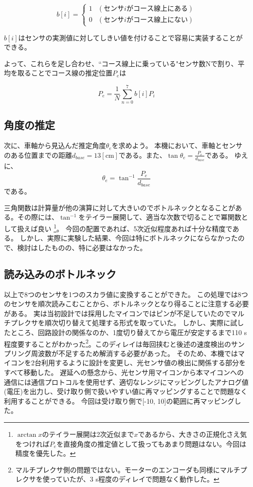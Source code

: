 \documentclass{ltjsreport}
\begin{document}
\begin{equation}
  b[i] = 
  \begin{cases}
   1 & (センサiがコース線上にある) \\
   0 & (センサiがコース線上にない)
   \end{cases}
\end{equation}

$b[i]$はセンサの実測値に対してしきい値を付けることで容易に実装することができる。

よって、これらを足し合わせ、``コース線上に乗っている"センサ数Nで割り、平均を取ることでコース線の推定位置$P_e$は

\[ 
  P_e = \frac{1}{N} \sum_{n=0}^7 b[i] P_i
    \]

\subsection{角度の推定}

次に、車軸から見込んだ推定角度$\theta_e$を求めよう。
本機において、車軸とセンサのある位置までの距離$d_{base} = 13 [\mathrm{cm}]$である。また、$\tan \theta_e = \frac{P_e}{d_{base}}$である。
ゆえに、
\[
  \theta_e =  \tan^{-1} \frac{P_e}{d_{base}}
\]
である。

三角関数は計算量が他の演算に対して大きいのでボトルネックとなることがある。その際には、$\tan^{-1}$をテイラー展開して、適当な次数で切ることで冪関数として扱えば良い
\footnote{$\arctan x$のテイラー展開は2次近似まで$x$であるから、大きさの正規化さえ気をつければ$P_e$を直接角度の推定値として扱ってもあまり問題はない。今回は精度を優先した。}。
今回の配置であれば、5次近似程度あれば十分な精度である。
しかし、実際に実験した結果、今回は特にボトルネックにならなかったので、検討はしたものの、特に必要はなかった。

\subsection{読み込みのボトルネック}
以上で8つのセンサを1つのスカラ値に変換することができた。
この処理では8つのセンサを順次読みこむことから、ボトルネックとなり得ることに注意する必要がある。
実は当初設計では採用したマイコンではピンが不足していたのでマルチプレクサを順次切り替えて処理する形式を取っていた。
しかし、実際に試したところ、回路設計の関係なのか、1度切り替えてから電圧が安定するまで110 \mu s 程度要することがわかった\footnote{マルチプレクサ側の問題ではない。モーターのエンコーダも同様にマルチプレクサを使っていたが、3 \mu s程度のディレイで問題なく動作した。}。このディレイは毎回挟むと後述の速度検出のサンプリング周波数が不足するため解消する必要があった。
そのため、本機ではマイコンを2台利用するように設計を変更し、光センサ値の検出に関係する部分をすべて移動した。
遅延への懸念から、光センサ用マイコンから本マイコンへの通信には通信プロトコルを使用せず、適切なレンジにマッピングしたアナログ値(電圧)を出力し、受け取り側で扱いやすい値に再マッピングすることで問題なく利用することができる。
今回は受け取り側で[-10, 10]の範囲に再マッピングした。
\end{document}
